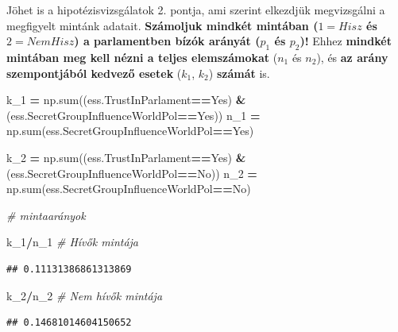 \documentclass[
]{book}
\newenvironment{Shaded}{\begin{snugshade}}{\end{snugshade}}
\newcommand{\BuiltInTok}[1]{#1}
\newcommand{\CommentTok}[1]{\textcolor[rgb]{0.56,0.35,0.01}{\textit{#1}}}
\newcommand{\NormalTok}[1]{#1}
\newcommand{\OperatorTok}[1]{\textcolor[rgb]{0.81,0.36,0.00}{\textbf{#1}}}
\newcommand{\StringTok}[1]{\textcolor[rgb]{0.31,0.60,0.02}{#1}}
\begin{document}
Jöhet is a hipotézisvizsgálatok 2. pontja, ami szerint elkezdjük megvizsgálni a megfigyelt mintánk adatait. \textbf{Számoljuk mindkét mintában (\(1=Hisz\) és \(2=NemHisz\)) a parlamentben bízók arányát (\(p_1\) és \(p_2\))!} Ehhez \textbf{mindkét mintában meg kell nézni a teljes elemszámokat} (\(n_1\) és \(n_2\)), és \textbf{az arány szempontjából kedvező esetek} (\(k_1\), \(k_2\)) \textbf{számát} is.

\begin{Shaded}
\begin{Highlighting}[]
\NormalTok{k\_1 }\OperatorTok{=}\NormalTok{ np.}\BuiltInTok{sum}\NormalTok{((ess.TrustInParlament}\OperatorTok{==}\StringTok{\textquotesingle{}Yes\textquotesingle{}}\NormalTok{) }\OperatorTok{\&}
\NormalTok{             (ess.SecretGroupInfluenceWorldPol}\OperatorTok{==}\StringTok{\textquotesingle{}Yes\textquotesingle{}}\NormalTok{))}
\NormalTok{n\_1 }\OperatorTok{=}\NormalTok{ np.}\BuiltInTok{sum}\NormalTok{(ess.SecretGroupInfluenceWorldPol}\OperatorTok{==}\StringTok{\textquotesingle{}Yes\textquotesingle{}}\NormalTok{)}

\NormalTok{k\_2 }\OperatorTok{=}\NormalTok{ np.}\BuiltInTok{sum}\NormalTok{((ess.TrustInParlament}\OperatorTok{==}\StringTok{\textquotesingle{}Yes\textquotesingle{}}\NormalTok{) }\OperatorTok{\&}
\NormalTok{             (ess.SecretGroupInfluenceWorldPol}\OperatorTok{==}\StringTok{\textquotesingle{}No\textquotesingle{}}\NormalTok{))}
\NormalTok{n\_2 }\OperatorTok{=}\NormalTok{ np.}\BuiltInTok{sum}\NormalTok{(ess.SecretGroupInfluenceWorldPol}\OperatorTok{==}\StringTok{\textquotesingle{}No\textquotesingle{}}\NormalTok{)}

\CommentTok{\# mintaarányok}

\NormalTok{k\_1}\OperatorTok{/}\NormalTok{n\_1 }\CommentTok{\# Hívők mintája}
\end{Highlighting}
\end{Shaded}

\begin{verbatim}
## 0.11131386861313869
\end{verbatim}

\begin{Shaded}
\begin{Highlighting}[]
\NormalTok{k\_2}\OperatorTok{/}\NormalTok{n\_2 }\CommentTok{\# Nem hívők mintája}
\end{Highlighting}
\end{Shaded}

\begin{verbatim}
## 0.14681014604150652
\end{verbatim}
\end{document}
